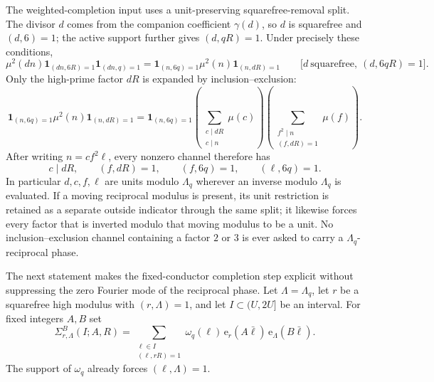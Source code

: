 \documentclass[11pt]{article}
\theoremstyle{definition}
\theoremstyle{remark}
\newcommand{\1}{\mathbf 1}
\newcommand{\e}{\mathrm e}
\begin{document}
The weighted-completion input uses a unit-preserving squarefree-removal split.
The divisor $d$ comes from the companion coefficient $\gamma(d)$, so $d$ is
squarefree and $(d,6)=1$; the active support further gives $(d,qR)=1$.  Under
precisely these conditions,
\begin{equation}\label{eq:fixed-q-squarefree-removal}
\boxed{
 \mu^2(dn)\1_{(dn,6R)=1}\1_{(dn,q)=1}
 =\1_{(n,6q)=1}\mu^2(n)\1_{(n,dR)=1}
}\qquad
\bigl[d\ \text{squarefree},\ (d,6qR)=1\bigr].
\end{equation}
Only the high-prime factor $dR$ is expanded by inclusion--exclusion:
\[
 \1_{(n,6q)=1}\mu^2(n)\1_{(n,dR)=1}
 =\1_{(n,6q)=1}
 \left(\sum_{\substack{c\mid dR\\c\mid n}}\mu(c)\right)
 \left(\sum_{\substack{f^2\mid n\\(f,dR)=1}}\mu(f)\right).
\]
After writing $n=cf^2\ell$, every nonzero channel therefore has
\[
 c\mid dR,\qquad (f,dR)=1,\qquad
 (f,6q)=1,\qquad(\ell,6q)=1.
\]
In particular $d,c,f,\ell$ are units modulo $\Lambda_q$ wherever an inverse
modulo $\Lambda_q$ is evaluated.  If a moving reciprocal modulus is present,
its unit restriction is retained as a separate outside indicator through the
same split; it likewise forces every factor that is inverted modulo that moving
modulus to be a unit.  No inclusion--exclusion channel containing a factor $2$
or $3$ is ever asked to carry a $\Lambda_q$-reciprocal phase.

The next statement makes the fixed-conductor completion step explicit without
suppressing the zero Fourier mode of the reciprocal phase.  Let
$\Lambda=\Lambda_q$, let $r$ be a squarefree high modulus with
$(r,\Lambda)=1$, and let $I\subset(U,2U]$ be an interval.  For fixed integers
$A,B$ set
\begin{equation}\label{eq:fixed-conductor-sigma}
\Sigma_{r,\Lambda}^{B}(I;A,R)
=\sum_{\substack{\ell\in I\\(\ell,rR)=1}}
 \omega_q(\ell)\,
 \e_r(A\bar\ell)\,
 \e_{\Lambda}(B\bar\ell).
\end{equation}
The support of $\omega_q$ already forces $(\ell,\Lambda)=1$.
\end{document}
